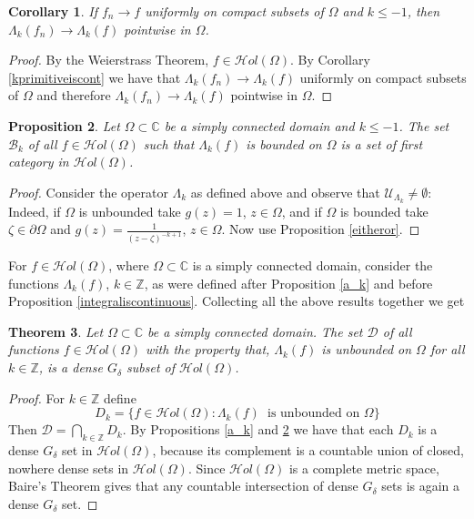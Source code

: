 \documentclass[11pt,twoside,a4paper]{article}
\newtheorem{theorem}{Theorem}[section]
\newtheorem{proposition}[theorem]{Proposition}
\newtheorem{corollary}[theorem]{Corollary}
\theoremstyle{remark}
\newcommand{\hol}{{\mathcal Hol}}
\newcommand{\holo}{{\mathcal Hol}(\Omega)}
\begin{document}
\begin{corollary}
\label{pointwisekprimitive}
  If $f_n \longrightarrow f$ uniformly on compact subsets of $\Omega$ and $k \leq -1$, then $\Lambda_k(f_n) \longrightarrow \Lambda_k(f)$ pointwise in $\Omega$.
\end{corollary}
\begin{proof}
  By the Weierstrass Theorem, $f \in \hol(\Omega)$. By Corollary \ref{kprimitiveiscont} we have that $\Lambda_k(f_n) \longrightarrow \Lambda_k(f)$ uniformly on compact subsets of $\Omega$ and therefore $\Lambda_k(f_n) \longrightarrow \Lambda_k(f)$ pointwise in $\Omega$.
\end{proof}
\begin{proposition}
\label{b_k}
  Let $\Omega \subset \mathbb{C}$ be a simply connected domain and $k \leq -1$. The set $\mathcal{B}_k$ of all $f \in \hol(\Omega)$ such that $\Lambda_k(f)$ is bounded on $\Omega$ is a set of first category in $\hol(\Omega)$.
\end{proposition}
\begin{proof}
Consider the operator $\Lambda_k$ as defined above and observe that $\mathcal{U}_{\Lambda_k} \neq \emptyset$:
  Indeed, if $\Omega $ is unbounded take $g(z)=1$, $z\in \Omega$, and if $\Omega $ is bounded take $\zeta \in \partial \Omega$ and $g(z)=\frac{1}{(z-\zeta)^{-k+1}}$, $z \in \Omega$. Now use Proposition \ref{eitheror}.
\end{proof}
For $f \in \holo$, where $\Omega \subset \mathbb{C}$ is a simply connected domain, consider the functions $\Lambda_k(f)$, $k \in \mathbb{Z}$, as were defined after Proposition \ref{a_k} and before Proposition \ref{integraliscontinuous}. Collecting all the above results together we get
\begin{theorem}
\label{d}
Let $\Omega \subset \mathbb{C}$ be a simply connected domain. The set $\mathcal{D}$ of all functions $f \in \hol(\Omega)$ with the property that, $\Lambda_k(f)$ is unbounded on $\Omega$ for all $k \in \mathbb{Z}$, is a dense $G_\delta$ subset of $\hol(\Omega)$.
\end{theorem}
\begin{proof}
  For $k \in \mathbb{Z}$ define
  \begin{equation*}
    D_k = \big\{ f \in \hol(\Omega): \Lambda_k(f)  \hspace{3pt} \text{ is unbounded on } \Omega \big\}
  \end{equation*}
  Then $\mathcal{D} = \bigcap \limits_{k \in \mathbb{Z}}D_k$. By Propositions \ref{a_k} and \ref{b_k} we have that each $D_k$ is a dense $G_\delta$ set in $\hol(\Omega)$, because its complement is a countable union of closed, nowhere dense sets in $\hol(\Omega)$. Since $\hol(\Omega)$ is a complete metric space, Baire's Theorem gives that any countable intersection of dense $G_\delta $ sets is again a dense $G_\delta $ set.
\end{proof}
\end{document}
